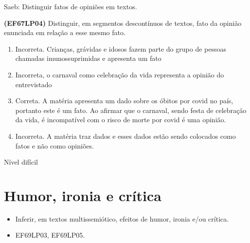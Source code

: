 Saeb: Distinguir fatos de opiniões em textos.

\textbf{(EF67LP04)} Distinguir, em segmentos descontínuos de textos,
fato da opinião enunciada em relação a esse mesmo fato.

\begin{enumerate}
\def\labelenumi{\alph{enumi})}
\item
  Incorreta. Crianças, grávidas e idosos fazem parte do grupo de pessoas
  chamadas imunossuprimidas e apresenta um fato
\item
  Incorreta, o carnaval como celebração da vida representa a opinião do
  entrevistado
\item
  Correta. A matéria apresenta um dado sobre os óbitos por covid no
  país, portanto este é um fato. Ao afirmar que o carnaval, sendo festa
  de celebração da vida, é incompatível com o risco de morte por covid é
  uma opinião.
\item
  Incorreta. A matéria traz dados e esses dados estão sendo colocados
  como fatos e não como opiniões.
\end{enumerate}

Nível difícil


\chapter{Humor, ironia e crítica}


\begin{itemize}

  \item Inferir, em textos multissemiótico, efeitos de humor, ironia e/ou
  crítica.

\end{itemize}


\begin{itemize}

  \item EF69LP03, EF69LP05.

\end{itemize}

